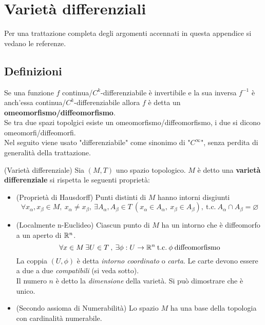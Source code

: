 \section{Varietà differenziali}\label{sec:vardiff}
Per una trattazione completa degli argomenti accennati in questa appendice
si vedano le referenze.
\subsection{Definizioni}
Se una funzione $f$ continua/$C^k$-differenziabile è invertibile e la sua inversa $f^{-1}$
è anch'essa continua/$C^k$-differenziabile allora
$f$ è detta un \textbf{omeomorfismo/diffeomorfismo}.\\
Se tra due spazi topolgici esiste un omeomorfismo/diffeomorfismo, i due si dicono
omeomorfi/diffeomorfi.\\
Nel seguito viene usato "differenziabile" come sinonimo di "$C^\infty$", senza
perdita di generalità della trattazione.

\begin{definition}{(Varietà differenziale)}
\label{def:var_differenziale}
   Sia $(M ,T)$ uno spazio topologico. $M$ è detto una \textbf{varietà
   differenziale} si rispetta le seguenti proprietà:
  \begin{itemize}
     \item (Proprietà di Hausdorff) Punti distinti di $M$ hanno intorni disgiunti
     $$\forall x_\alpha,x_\beta \in M, \: x_\alpha \neq x_\beta , \:
       \exists A_\alpha , A_\beta \in T \: (x_\alpha \in A_\alpha , \:
       x_\beta \in A_\beta),
       \: \mathrm{t.c.} \: A_\alpha \cap A_\beta = \varnothing $$

     \item (Localmente n-Euclideo) Ciascun punto di $M$ ha un intorno che è
     diffeomorfo a un aperto di $\mathbb{R}^n$.
     $$
       \forall x \in M \: \exists U \in T \:,\: \exists\phi : U \to \mathbb{R}^n
          \mathrm{\: t.c.\:} \phi \mathrm{\: diffeomorfismo}
     $$
     La coppia $(U,\phi)$ è detta \emph{intorno coordinato} o \emph{carta}.
     Le carte devono essere a due a due \emph{compatibili} (si veda sotto).\\
     Il numero $n$ è detto la \emph{dimensione} della varietà. Si può dimostrare che è unico.

     \item (Secondo assioma di Numerabilità) Lo spazio $M$ ha una base della topologia
     con cardinalità numerabile.
  \end{itemize}
\end{definition}

